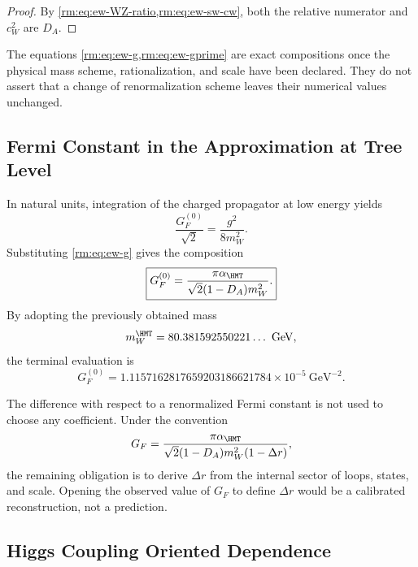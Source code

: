 \begin{proof}
By \cref{rm:eq:ew-WZ-ratio,rm:eq:ew-sw-cw}, both the relative numerator and
\(c_W^2\) are \(D_A\).
\end{proof}

The equations \cref{rm:eq:ew-g,rm:eq:ew-gprime} are exact compositions once the
physical mass scheme, rationalization, and scale have been declared. They do not
assert that a change of renormalization scheme leaves their
numerical values unchanged.

\subsection{Fermi Constant in the Approximation at Tree Level}

In natural units, integration of the charged propagator at low
energy yields
\begin{equation}
\label{rm:eq:ew-GF-def}
\frac{G_F^{(0)}}{\sqrt2}=\frac{g^2}{8m_W^2}.
\end{equation}
Substituting \cref{rm:eq:ew-g} gives the composition
\begin{equation}
\label{rm:eq:ew-GF}
\boxed{
G_F^{(0)}
=\frac{\pi\alpha_{\HMT}}
{\sqrt2(1-D_A)m_W^2}.}
\end{equation}
By adopting the previously obtained mass
\begin{equation}
\label{rm:eq:ew-W-output}
m_W^{\HMT}=80.381592550221\ldots\ \mathrm{GeV},
\end{equation}
the terminal evaluation is
\begin{equation}
\label{rm:eq:ew-GF-value}
\boxed{
G_F^{(0)}
=1.1157162817659203186621784\times10^{-5}\ \mathrm{GeV}^{-2}.}
\end{equation}

The difference with respect to a renormalized Fermi constant is not used
to choose any coefficient. Under the convention
\begin{equation}
\label{rm:eq:ew-Delta-r}
G_F
=\frac{\pi\alpha_{\HMT}}
{\sqrt2(1-D_A)m_W^2(1-\Delta r)},
\end{equation}
the remaining obligation is to derive \(\Delta r\) from the internal sector of
loops, states, and scale. Opening the observed value of \(G_F\) to define
\(\Delta r\) would be a calibrated reconstruction, not a prediction.

\subsection{Higgs Coupling Oriented Dependence}

